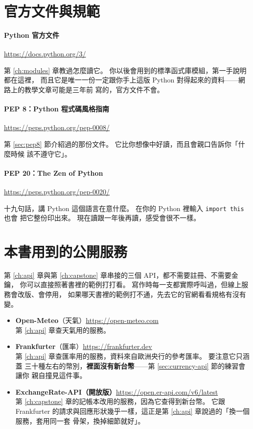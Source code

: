 \section*{官方文件與規範}

\paragraph{Python 官方文件}\url{https://docs.python.org/3/}

第 \ref{ch:modules} 章教過怎麼讀它。 你以後會用到的標準函式庫模組，第一手說明都在這裡，
而且它是唯一一份一定跟你手上這版 Python 對得起來的資料——網路上的教學文章可能是三年前
寫的，官方文件不會。

\paragraph{PEP 8：Python 程式碼風格指南}\url{https://peps.python.org/pep-0008/}

第 \ref{sec:pep8} 節介紹過的那份文件。 它比你想像中好讀，而且會親口告訴你「什麼時候
該不遵守它」。

\paragraph{PEP 20：The Zen of Python}\url{https://peps.python.org/pep-0020/}

十九句話，講 Python 這個語言在意什麼。 在你的 Python 裡輸入 \texttt{import this} 也會
把它整份印出來。 現在讀跟一年後再讀，感受會很不一樣。

\section*{本書用到的公開服務}

第 \ref{ch:api} 章與第 \ref{ch:capstone} 章串接的三個 API，都不需要註冊、不需要金鑰，
你可以直接照著書裡的範例打打看。 寫作時每一支都實際呼叫過，但線上服務會改版、會停用，
如果哪天書裡的範例打不通，先去它的官網看看規格有沒有變。

\begin{itemize}
    \item \textbf{Open-Meteo}（天氣）\quad \url{https://open-meteo.com}\\
    第 \ref{ch:api} 章查天氣用的服務。
    \item \textbf{Frankfurter}（匯率）\quad \url{https://frankfurter.dev}\\
    第 \ref{ch:api} 章查匯率用的服務，資料來自歐洲央行的參考匯率。 要注意它只涵蓋
    三十種左右的幣別，\textbf{裡面沒有新台幣}——第 \ref{sec:currency-api} 節的練習會讓你
    親自撞見這件事。
    \item \textbf{ExchangeRate-API（開放版）}\quad \url{https://open.er-api.com/v6/latest}\\
    第 \ref{ch:capstone} 章的記帳本改用的服務，因為它查得到新台幣。 它跟 Frankfurter
    的請求與回應形狀幾乎一樣，這正是第 \ref{ch:api} 章說過的「換一個服務，套用同一套
    骨架，換掉細節就好」。
\end{itemize}
